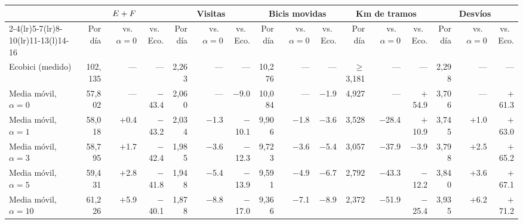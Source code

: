 \begin{tabular}{@{}lrrrrrrrrrrrrrrr@{}}
\toprule
 & \multicolumn{3}{c}{$E+F$} & \multicolumn{3}{c}{Visitas} & \multicolumn{3}{c}{Bicis movidas} & \multicolumn{3}{c}{Km de tramos} & \multicolumn{3}{c}{Desvíos} \\
\cmidrule(lr){2-4}\cmidrule(lr){5-7}\cmidrule(lr){8-10}\cmidrule(lr){11-13}\cmidrule(l){14-16}
 & Por día & vs.\ $\alpha{=}0$ & vs.\ Eco. & Por día & vs.\ $\alpha{=}0$ & vs.\ Eco. & Por día & vs.\ $\alpha{=}0$ & vs.\ Eco. & Por día & vs.\ $\alpha{=}0$ & vs.\ Eco. & Por día & vs.\ $\alpha{=}0$ & vs.\ Eco. \\
\midrule
Ecobici (medido) & 102,135 & --- & --- & 2,263 & --- & --- & 10,276 & --- & --- & $\ge$3,181 & --- & --- & 2,298 & --- & --- \\
\midrule
Media móvil, $\alpha=0$ & 57,802 & --- & $-$43.4 & 2,060 & --- & $-$9.0 & 10,084 & --- & $-$1.9 & 4,927 & --- & $+$54.9 & 3,706 & --- & $+$61.3 \\
Media móvil, $\alpha=1$ & 58,018 & $+$0.4 & $-$43.2 & 2,034 & $-$1.3 & $-$10.1 & 9,906 & $-$1.8 & $-$3.6 & 3,528 & $-$28.4 & $+$10.9 & 3,745 & $+$1.0 & $+$63.0 \\
Media móvil, $\alpha=3$ & 58,795 & $+$1.7 & $-$42.4 & 1,985 & $-$3.6 & $-$12.3 & 9,723 & $-$3.6 & $-$5.4 & 3,057 & $-$37.9 & $-$3.9 & 3,798 & $+$2.5 & $+$65.2 \\
Media móvil, $\alpha=5$ & 59,431 & $+$2.8 & $-$41.8 & 1,948 & $-$5.4 & $-$13.9 & 9,591 & $-$4.9 & $-$6.7 & 2,792 & $-$43.3 & $-$12.2 & 3,840 & $+$3.6 & $+$67.1 \\
Media móvil, $\alpha=10$ & 61,226 & $+$5.9 & $-$40.1 & 1,878 & $-$8.8 & $-$17.0 & 9,366 & $-$7.1 & $-$8.9 & 2,372 & $-$51.9 & $-$25.4 & 3,935 & $+$6.2 & $+$71.2 \\
\bottomrule
\end{tabular}
